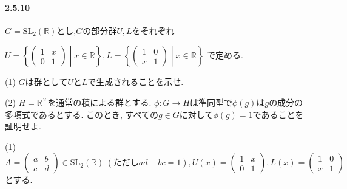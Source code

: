 \paragraph{2.5.10} $G=\mathrm{SL}_2(\mathbb{R})$とし,$G$の部分群$U,L$をそれぞれ

$U=\left\{ \begin{pmatrix}1&x\\0&1\end{pmatrix} \middle\vert x \in \mathbb{R} \right \}, 
L=\left \{ \begin{pmatrix}1&0\\x&1\end{pmatrix}\middle\vert x \in \mathbb{R} \right \}$
で定める.

(1) $G$は群として$U$と$L$で生成されることを示せ.

(2) $H=\mathbb{R}^\times$を通常の積による群とする.
$\phi:G \to H$は準同型で$\phi(g)$は$g$の成分の多項式であるとする.
このとき, すべての$g \in G$に対して$\phi(g)=1$であることを証明せよ.

(1)
\[
A=\begin{pmatrix}a&b\\c&d\end{pmatrix}\in \mathrm{SL}_2(\mathbb{R})\:(\text{ただし}ad-bc=1),
U(x)=\begin{pmatrix}1&x\\0&1\end{pmatrix}, L(x)=\begin{pmatrix}1&0\\x&1\end{pmatrix}
\]
とする.

